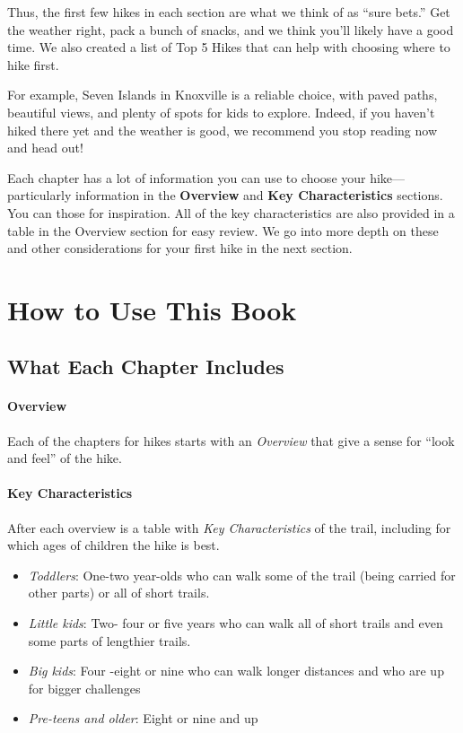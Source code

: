 \documentclass[
  letterpaper,
  DIV=11,
  numbers=noendperiod]{scrreprt}
\providecommand{\tightlist}{%
  \setlength{\itemsep}{0pt}\setlength{\parskip}{0pt}}\usepackage{longtable,booktabs,array}
\begin{document}
Thus, the first few hikes in each section are what we think of as ``sure
bets.'' Get the weather right, pack a bunch of snacks, and we think
you'll likely have a good time. We also created a list of Top 5 Hikes
that can help with choosing where to hike first.

For example, Seven Islands in Knoxville is a reliable choice, with paved
paths, beautiful views, and plenty of spots for kids to explore. Indeed,
if you haven't hiked there yet and the weather is good, we recommend you
stop reading now and head out!

Each chapter has a lot of information you can use to choose your
hike---particularly information in the \textbf{Overview} and \textbf{Key
Characteristics} sections. You can those for inspiration. All of the key
characteristics are also provided in a table in the Overview section for
easy review. We go into more depth on these and other considerations for
your first hike in the next section.

\part{How to Use This Book}

\chapter{What Each Chapter Includes}\label{what-each-chapter-includes}

\subsection{Overview}\label{overview}

Each of the chapters for hikes starts with an \emph{Overview} that give
a sense for ``look and feel'' of the hike.

\subsection{Key Characteristics}\label{key-characteristics}

After each overview is a table with \emph{Key Characteristics} of the
trail, including for which ages of children the hike is best.

\begin{itemize}
\tightlist
\item
  \emph{Toddlers}: One-two year-olds who can walk some of the trail
  (being carried for other parts) or all of short trails.
\item
  \emph{Little kids}: Two- four or five years who can walk all of short
  trails and even some parts of lengthier trails.
\item
  \emph{Big kids}: Four -eight or nine who can walk longer distances and
  who are up for bigger challenges
\item
  \emph{Pre-teens and older}: Eight or nine and up
\end{itemize}
\end{document}
